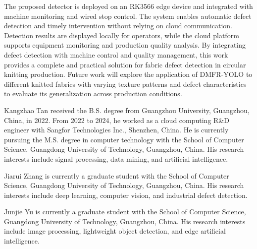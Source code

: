 \documentclass[journal]{IEEEtran}
\newcommand{\model}{DMFR-YOLO\xspace}
\begin{document}
The proposed detector is deployed on an RK3566 edge device and integrated with machine monitoring and wired stop control. The system enables automatic defect detection and timely intervention without relying on cloud communication. Detection results are displayed locally for operators, while the cloud platform supports equipment monitoring and production quality analysis. By integrating defect detection with machine control and quality management, this work provides a complete and practical solution for fabric defect detection in circular knitting production. Future work will explore the application of \model to different knitted fabrics with varying texture patterns and defect characteristics to evaluate its generalization across production conditions.

\FloatBarrier



\raggedend
\newpage
\begin{IEEEbiographynophoto}{Kangzhao Tan}
received the B.S. degree from Guangzhou University, Guangzhou, China, in 2022. From 2022 to 2024, he worked as a cloud computing R\&D engineer with Sangfor Technologies Inc., Shenzhen, China. He is currently pursuing the M.S. degree in computer technology with the School of Computer Science, Guangdong University of Technology, Guangzhou, China. His research interests include signal processing, data mining, and artificial intelligence.
\end{IEEEbiographynophoto}

\begin{IEEEbiographynophoto}{Jiarui Zhang}
is currently a graduate student with the School of Computer Science, Guangdong University of Technology, Guangzhou, China. His research interests include deep learning, computer vision, and industrial defect detection.
\end{IEEEbiographynophoto}

\begin{IEEEbiographynophoto}{Junjie Yu}
is currently a graduate student with the School of Computer Science, Guangdong University of Technology, Guangzhou, China. His research interests include image processing, lightweight object detection, and edge artificial intelligence.
\end{IEEEbiographynophoto}
\end{document}
